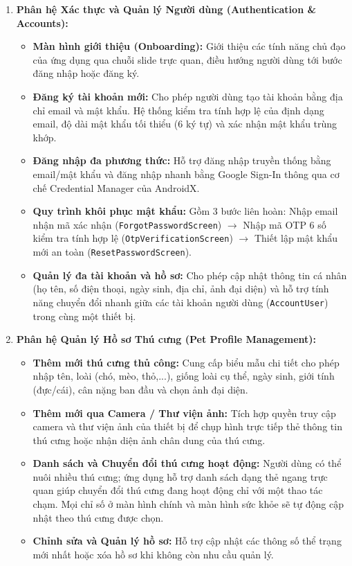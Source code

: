 \begin{enumerate}
    \item \textbf{Phân hệ Xác thực và Quản lý Người dùng (Authentication \& Accounts):}
    \begin{itemize}
        \item \textbf{Màn hình giới thiệu (Onboarding):} Giới thiệu các tính năng chủ đạo của ứng dụng qua chuỗi slide trực quan, điều hướng người dùng tới bước đăng nhập hoặc đăng ký.
        \item \textbf{Đăng ký tài khoản mới:} Cho phép người dùng tạo tài khoản bằng địa chỉ email và mật khẩu. Hệ thống kiểm tra tính hợp lệ của định dạng email, độ dài mật khẩu tối thiểu (6 ký tự) và xác nhận mật khẩu trùng khớp.
        \item \textbf{Đăng nhập đa phương thức:} Hỗ trợ đăng nhập truyền thống bằng email/mật khẩu và đăng nhập nhanh bằng Google Sign-In thông qua cơ chế Credential Manager của AndroidX.
        \item \textbf{Quy trình khôi phục mật khẩu:} Gồm 3 bước liên hoàn: Nhập email nhận mã xác nhận (\texttt{ForgotPasswordScreen}) $\rightarrow$ Nhập mã OTP 6 số kiểm tra tính hợp lệ (\texttt{OtpVerificationScreen}) $\rightarrow$ Thiết lập mật khẩu mới an toàn (\texttt{ResetPasswordScreen}).
        \item \textbf{Quản lý đa tài khoản và hồ sơ:} Cho phép cập nhật thông tin cá nhân (họ tên, số điện thoại, ngày sinh, địa chỉ, ảnh đại diện) và hỗ trợ tính năng chuyển đổi nhanh giữa các tài khoản người dùng (\texttt{AccountUser}) trong cùng một thiết bị.
    \end{itemize}

    \item \textbf{Phân hệ Quản lý Hồ sơ Thú cưng (Pet Profile Management):}
    \begin{itemize}
        \item \textbf{Thêm mới thú cưng thủ công:} Cung cấp biểu mẫu chi tiết cho phép nhập tên, loài (chó, mèo, thỏ,...), giống loài cụ thể, ngày sinh, giới tính (đực/cái), cân nặng ban đầu và chọn ảnh đại diện.
        \item \textbf{Thêm mới qua Camera / Thư viện ảnh:} Tích hợp quyền truy cập camera và thư viện ảnh của thiết bị để chụp hình trực tiếp thẻ thông tin thú cưng hoặc nhận diện ảnh chân dung của thú cưng.
        \item \textbf{Danh sách và Chuyển đổi thú cưng hoạt động:} Người dùng có thể nuôi nhiều thú cưng; ứng dụng hỗ trợ danh sách dạng thẻ ngang trực quan giúp chuyển đổi thú cưng đang hoạt động chỉ với một thao tác chạm. Mọi chỉ số ở màn hình chính và màn hình sức khỏe sẽ tự động cập nhật theo thú cưng được chọn.
        \item \textbf{Chỉnh sửa và Quản lý hồ sơ:} Hỗ trợ cập nhật các thông số thể trạng mới nhất hoặc xóa hồ sơ khi không còn nhu cầu quản lý.
    \end{itemize}


\end{enumerate}

